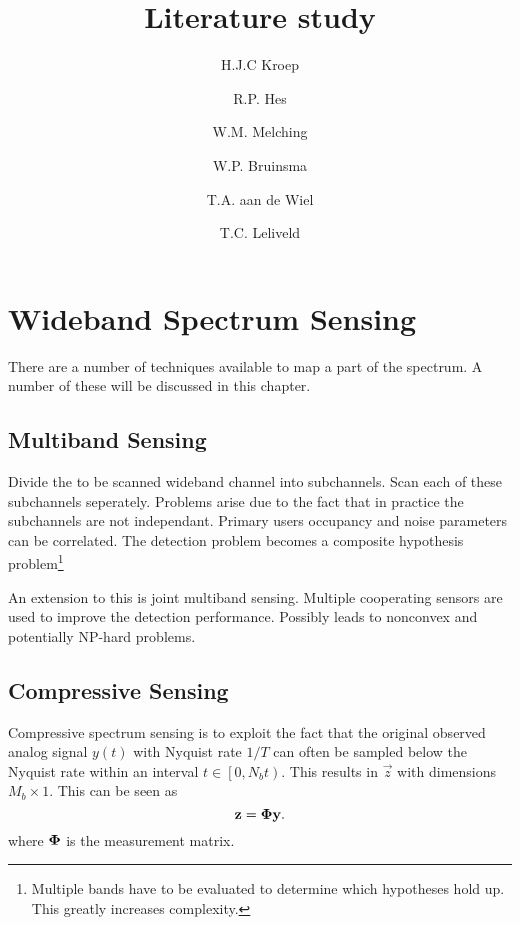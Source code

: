 \documentclass[report]{memoir}
\title{Literature study}
\author{H.J.C Kroep \and R.P. Hes \and W.M. Melching \and W.P. Bruinsma \and T.A. aan de Wiel \and T.C. Leliveld}
\begin{document}
\chapter{Wideband Spectrum Sensing}
There are a number of techniques available to map a part of the spectrum. A number of these will be discussed in this chapter.

\section{Multiband Sensing}
Divide the to be scanned wideband channel into subchannels. Scan each of these subchannels seperately. Problems arise due to the fact that in practice the subchannels are not independant. Primary users occupancy and noise parameters can be correlated. The detection problem becomes a composite hypothesis problem\footnote{Multiple bands have to be evaluated to determine which hypotheses hold up. This greatly increases complexity.}

An extension to this is joint multiband sensing. Multiple cooperating sensors are used to improve the detection performance. Possibly leads to nonconvex and potentially NP-hard problems.

\section{Compressive Sensing}
Compressive spectrum sensing is to exploit the fact that the original observed analog signal $y(t)$ with Nyquist rate $1/T$ can often be sampled below the Nyquist rate within an interval $t\in \left[0,N_{b}t \right)$. This results in $\vec{z}$ with dimensions $M_b \times 1$. This can be seen as 
\begin{equation}
    \label{eq:nonuniformsampling}
    \boldsymbol{\mathbf{z}} = \boldsymbol{\mathbf{\Phi}}\boldsymbol{\mathbf{y}}.
\end{equation}
where $\boldsymbol{\mathbf{\Phi}}$ is the measurement matrix.
\end{document}
